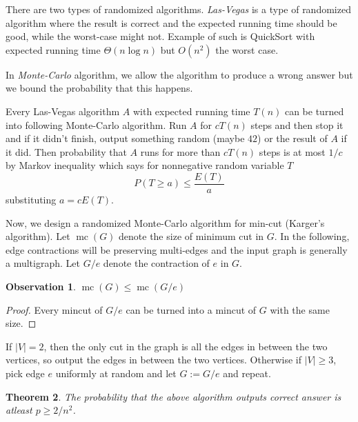 \documentclass{article}
\theoremstyle{plain}
\newtheorem{thm}{Theorem}[section]
\newtheorem{pozo}[thm]{Observation}
\theoremstyle{definition}
\begin{document}
There are two types of randomized algorithms. \textit{Las-Vegas} is a type of randomized algorithm where the result is correct and the expected running time should be good, while the worst-case might not. Example of such is QuickSort with expected running time $\Theta(n\log n)$ but $O(n^2)$ the worst case.

In \textit{Monte-Carlo} algorithm, we allow the algorithm to produce a wrong answer but we bound the probability that this happens.

Every Las-Vegas algorithm $A$ with expected running time $T(n)$ can be turned into following Monte-Carlo algorithm. Run $A$ for $cT(n)$ steps and then stop it and if it didn't finish, output something random (maybe $42$) or the result of $A$ if it did. Then probability that $A$ runs for more than $cT(n)$ steps is at most $1/c$ by Markov inequality which says for nonnegative random variable $T$
$$
P(T\geq a)\leq \frac{E(T)}{a}
$$
substituting $a=cE(T)$.


Now, we design a randomized Monte-Carlo algorithm for min-cut (Karger's algorithm). Let $\operatorname{mc}(G)$ denote the size of minimum cut in $G$. In the following, edge contractions will be preserving multi-edges and the input graph is generally a multigraph. Let $G/e$ denote the contraction of $e$ in $G$.
\begin{pozo}
	$\operatorname{mc}(G)\leq \operatorname{mc}(G/e)$
\end{pozo}
\begin{proof}
	Every mincut of $G/e$ can be turned into a mincut of $G$ with the same size.
\end{proof}

If $|V|=2$, then the only cut in the graph is all the edges in between the two vertices, so output the edges in between the two vertices. Otherwise if $|V|\geq 3$, pick edge $e$ uniformly at random and let $G:=G/e$ and repeat. 

\begin{thm}
	The probability that the above algorithm outputs correct answer is atleast $p\geq 2/n^2$.
\end{thm}
\end{document}
